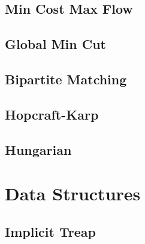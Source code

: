 \subsection{	Min Cost Max Flow}
\raggedbottom
\hrulefill
\subsection{	Global Min Cut}
\raggedbottom
\hrulefill
\subsection{Bipartite Matching}
\raggedbottom
\hrulefill
\subsection{	Hopcraft-Karp}
\raggedbottom
\hrulefill
\subsection{Hungarian}
\raggedbottom
\hrulefill

\section{Data Structures}
\subsection{Implicit Treap}
\raggedbottom
\hrulefill


